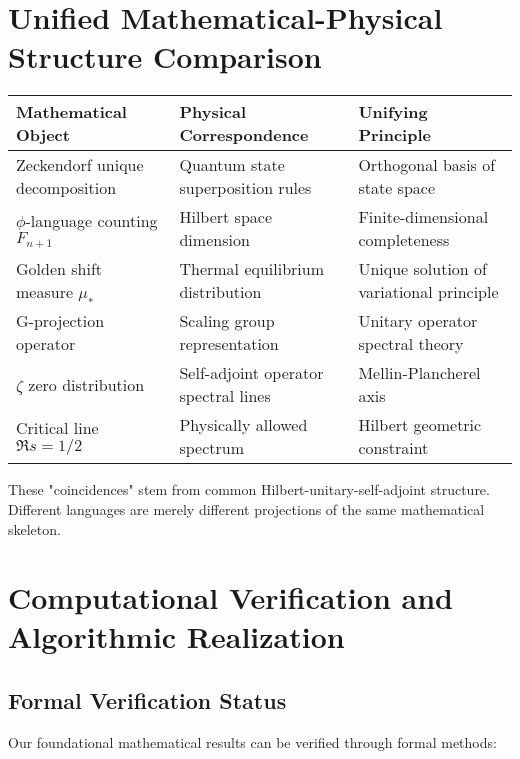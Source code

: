 \documentclass[12pt]{article}
\theoremstyle{plain}
\theoremstyle{definition}
\begin{document}
\section{Unified Mathematical-Physical Structure Comparison}
\begin{center}
\renewcommand{\arraystretch}{1.3}
{\small
\begin{tabular}{|p{4.3cm}|p{5.2cm}|p{3.8cm}|}
\hline
\textbf{Mathematical Object} & \textbf{Physical Correspondence} & \textbf{Unifying Principle} \\
\hline
Zeckendorf unique decomposition \cite{kimberling1994} & Quantum state superposition rules & Orthogonal basis of state space \\
\hline
$\phi$-language counting $F_{n+1}$ & Hilbert space dimension & Finite-dimensional completeness \\
\hline
Golden shift measure $\mu_*$ & Thermal equilibrium distribution & Unique solution of variational principle \\
\hline
G-projection operator & Scaling group representation & Unitary operator spectral theory \\
\hline
$\zeta$ zero distribution & Self-adjoint operator spectral lines & Mellin-Plancherel axis \\
\hline
Critical line $\Re s = 1/2$ & Physically allowed spectrum & Hilbert geometric constraint \\
\hline
\end{tabular}
}
\end{center}
These "coincidences" stem from common Hilbert-unitary-self-adjoint structure. Different languages are merely different projections of the same mathematical skeleton.

\section{Computational Verification and Algorithmic Realization}

\subsection{Formal Verification Status}

Our foundational mathematical results can be verified through formal methods:
\end{document}

